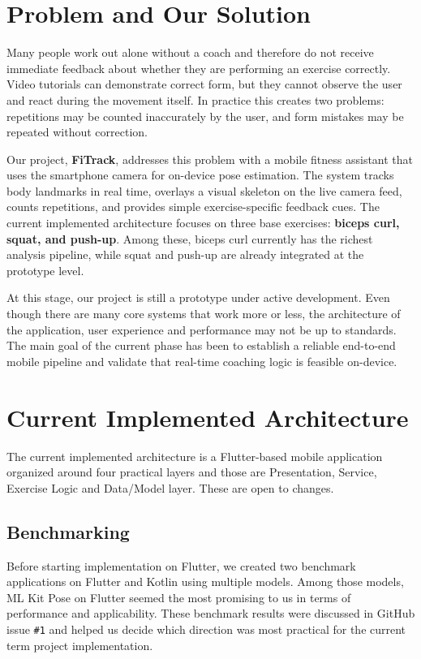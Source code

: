 \documentclass[12pt,a4paper]{article}
\begin{document}
\tableofcontents
\newpage

\section{Problem and Our Solution}

Many people work out alone without a coach and therefore do not receive immediate feedback about whether they are performing an exercise correctly. Video tutorials can demonstrate correct form, but they cannot observe the user and react during the movement itself. In practice this creates two problems: repetitions may be counted inaccurately by the user, and form mistakes may be repeated without correction.

Our project, \textbf{FiTrack}, addresses this problem with a mobile fitness assistant that uses the smartphone camera for on-device pose estimation. The system tracks body landmarks in real time, overlays a visual skeleton on the live camera feed, counts repetitions, and provides simple exercise-specific feedback cues. The current implemented architecture focuses on three base exercises: \textbf{biceps curl, squat, and push-up}. Among these, biceps curl currently has the richest analysis pipeline, while squat and push-up are already integrated at the prototype level.

At this stage, our project is still a prototype under active development. Even though there are many core systems that work more or less, the architecture of the application, user experience and performance may not be up to standards. The main goal of the current phase has been to establish a reliable end-to-end mobile pipeline and validate that real-time coaching logic is feasible on-device.

\section{Current Implemented Architecture}

The current implemented architecture is a Flutter-based mobile application organized around four practical layers and those are Presentation, Service, Exercise Logic and Data/Model layer. These are open to changes.

\subsection{Benchmarking}

Before starting implementation on Flutter, we created two benchmark applications on Flutter and Kotlin using multiple models. Among those models, ML Kit Pose on Flutter seemed the most promising to us in terms of performance and applicability. These benchmark results were discussed in GitHub issue \texttt{\#1} and helped us decide which direction was most practical for the current term project implementation.
\end{document}
